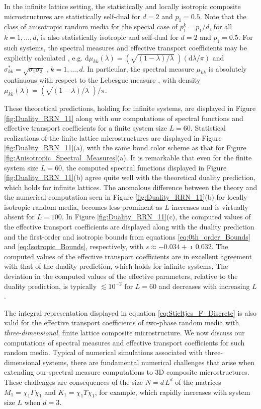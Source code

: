 \documentclass{cmslatex}
\renewcommand{\d}{\text{d}}
\begin{document}
In the infinite lattice setting, the statistically and locally
isotropic composite microstructures are statistically self-dual
\cite{MILTON:2002:TC} for $d=2$ and $p_1=0.5$. Note that the class of
anisotropic random media for the special case of $p_1^k=p_1/d$, for all
$k=1,\ldots,d$, is also statistically isotropic and self-dual for  $d=2$ and
$p_1=0.5$. For such systems, the spectral measures and 
effective transport coefficients may be explicitly calculated
\cite{MILTON:2002:TC},
e.g. $\d\mu_{kk}(\lambda)=(\sqrt{(1-\lambda)/\lambda}\;)(\d\lambda/\pi)$ and  
$\sigma^*_{kk}=\sqrt{\sigma_1\sigma_2}\;$, $k=1,\ldots,d$. In particular, the spectral
measure $\mu_{kk}$ is absolutely continuous with respect to the Lebesgue
measure \cite{Folland:95}, with density $\mu_{kk}(\lambda)=(\sqrt{(1-\lambda)/\lambda}\;)/\pi$. 




These theoretical predictions, holding for
infinite systems, are displayed in Figure \ref{fig:Duality_RRN_11}
along with our computations of spectral functions and effective
transport coefficients for a finite system size $L=60$. Statistical 
realizations of the finite lattice microstructures 
are displayed in Figure \ref{fig:Duality_RRN_11}(a), with the same
bond color scheme as that for Figure
\ref{fig:Anisotropic_Spectral_Measures}(a). It is remarkable that even
for the finite system size $L=60$, the computed spectral functions
displayed in Figure \ref{fig:Duality_RRN_11}(b) agree quite well with
the theoretical duality prediction, which holds for infinite lattices. The  
anomalous difference between the theory and the numerical computation
seen in Figure \ref{fig:Duality_RRN_11}(b) for locally isotropic
random media, becomes less prominent as $L$ increases and is virtually
absent for $L=100$. In Figure \ref{fig:Duality_RRN_11}(c), 
the computed values of the effective 
transport coefficients are displayed along with the
duality prediction and the first-order
and isotropic bounds from equations \eqref{eq:0th_order_Bounds} and
\eqref{eq:Isotropic_Bounds}, respectively, with
$s\approx-0.034+\imath\,0.032$. The computed values of the effective
transport coefficients are in excellent agreement with that of the
duality prediction, which holds for infinite systems. The
deviation in the computed values of the effective parameters, relative
to the duality prediction, is typically $\lesssim10^{-2}$ for $L=60$
and decreases with increasing $L$.




The integral representation displayed in equation
\eqref{eq:Stieltjes_F_Discrete} is also valid for the effective
transport coefficients of two-phase random media with
\emph{three-dimensional}, finite lattice composite microstructure. We
now discuss our computations of spectral measures and effective
transport coefficients for such random media. Typical of numerical
simulations associated with three-dimensional systems, there are
fundamental numerical challenges that arise when extending our
spectral measure computations to 3D composite microstructures. These
challenges are consequences of the size $N=d\,L^d$ of the matrices
$M_1=\chi_1\Gamma\chi_1$ and $K_1=\chi_1\Upsilon\chi_1$, for example, which rapidly increases
with system size $L$ when $d=3$.
\end{document}
